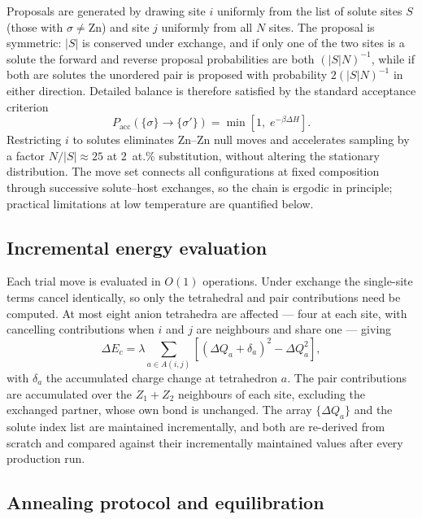 \documentclass[11pt,a4paper]{article}
\newcommand{\dQ}{\Delta Q}
\begin{document}
Proposals are generated by drawing site $i$ uniformly from the list of solute
sites $S$ (those with $\sigma \neq \mathrm{Zn}$) and site $j$ uniformly from all
$N$ sites. The proposal is symmetric: $|S|$ is conserved under exchange, and if
only one of the two sites is a solute the forward and reverse proposal
probabilities are both $(|S|N)^{-1}$, while if both are solutes the unordered
pair is proposed with probability $2(|S|N)^{-1}$ in either direction. Detailed
balance is therefore satisfied by the standard acceptance criterion
\begin{equation}
P_{\mathrm{acc}}\left(\{\sigma\} \to \{\sigma'\}\right) = \min\left[1,\; e^{-\beta \Delta H}\right].
\label{eq:metropolis}
\end{equation}
Restricting $i$ to solutes eliminates Zn--Zn null moves and accelerates sampling
by a factor $N/|S| \approx 25$ at 2~at.\% substitution, without altering the
stationary distribution. The move set connects all configurations at fixed
composition through successive solute--host exchanges, so the chain is ergodic
in principle; practical limitations at low temperature are quantified below.

\subsection{Incremental energy evaluation}

Each trial move is evaluated in $O(1)$ operations. Under exchange the
single-site terms cancel identically, so only the tetrahedral and pair
contributions need be computed. At most eight anion tetrahedra are affected ---
four at each site, with cancelling contributions when $i$ and $j$ are neighbours
and share one --- giving
\begin{equation}
\Delta E_c = \lambda \sum_{a \in A(i,j)}
\left[ \left( \dQ_a + \delta_a \right)^2 - \dQ_a^2 \right],
\end{equation}
with $\delta_a$ the accumulated charge change at tetrahedron $a$. The pair
contributions are accumulated over the $Z_1 + Z_2$ neighbours of each site,
excluding the exchanged partner, whose own bond is unchanged. The array
$\{\dQ_a\}$ and the solute index list are maintained incrementally, and both are
re-derived from scratch and compared against their incrementally maintained
values after every production run.

\subsection{Annealing protocol and equilibration}
\label{sec:protocol}
\end{document}
